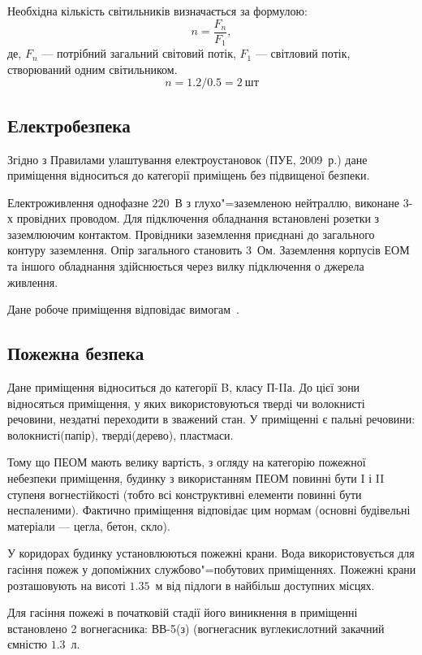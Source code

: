 \documentclass{diploma}
\begin{document}
      Необхідна кількість світильників визначається за формулою:
      \begin{equation}
        n = \frac{F_n}{F_1},
        \label{eq:n}
      \end{equation}
      де, $F_n$ --- потрібний загальний світовий потік, $F_1$ --- світловий
      потік, створюваний одним світильником.
      \[ n = 1.2 / 0.5 = 2~\text{шт} \]
    \subsection{Електробезпека}
      Згідно з Правилами улаштування електроустановок (ПУЕ, 2009~р.) дане
      приміщення відноситься до категорії приміщень без підвищеної безпеки.

      Електроживлення однофазне $220$~В з глухо"=заземленою нейтраллю,
      виконане 3-х провідних проводом.
      Для підключення обладнання встановлені розетки з заземлюючим контактом.
      Провідники заземлення приєднані до загального контуру заземлення.
      Опір загального становить $3$~Ом.
      Заземлення корпусів ЕОМ та іншого обладнання здійснюється через вилку
      підключення о джерела живлення.

      Дане робоче приміщення відповідає вимогам~\cite{dnaop131}.
    \subsection{Пожежна безпека}
      Дане приміщення відноситься до категорії B, класу П-IIа.
      До цієї зони відносяться приміщення, у яких використовуються тверді чи
      волокнисті речовини, нездатні переходити в зважений стан\cite{napb}.
      У приміщенні є пальні речовини: волокнисті(папір), тверді(дерево),
      пластмаси.

      Тому що ПЕОМ мають велику вартість, з огляду на категорію пожежної
      небезпеки приміщення, будинку з використанням ПЕОМ повинні бути I і II
      ступеня вогнестійкості (тобто всі конструктивні елементи повинні бути
      неспаленими).
      Фактично приміщення відповідає цим нормам (основні будівельні матеріали
      --- цегла, бетон, скло).

      У коридорах будинку установлюються пожежні крани.
      Вода використовується для гасіння пожеж у допоміжних службово"=побутових
      приміщеннях.
      Пожежні крани розташовують на висоті $1.35$~м від підлоги в найбільш
      доступних місцях.

      Для гасіння пожежі в початковій стадії його виникнення в приміщенні
      встановлено 2 вогнегасника: ВВ-5(з) (вогнегасник вуглекислотний закачний
      ємністю $1.3$~л.
\end{document}
